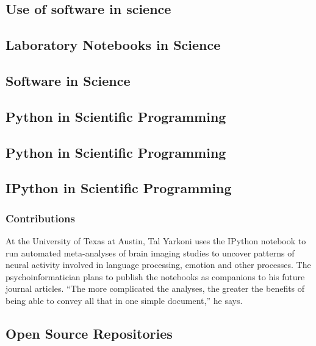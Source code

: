 
\subsection{Use of software in science}


\subsection{Laboratory Notebooks in Science}


\subsection{Software in Science}

\subsection{Python in Scientific Programming}




\subsection{Python in Scientific Programming}


\subsection{IPython in Scientific Programming}



\subsubsection{Contributions}


At the University of Texas at Austin, Tal Yarkoni
uses the IPython notebook to run automated
meta-analyses of brain imaging studies to
uncover patterns of neural activity involved in
language processing, emotion and other processes.
The psychoinformatician plans to publish
the notebooks as companions to his future
journal articles. “The more complicated the
analyses, the greater the benefits of being able to convey all that in one simple document,” he says.
\cite{shen2014interactive}

\subsection{Open Source Repositories}

